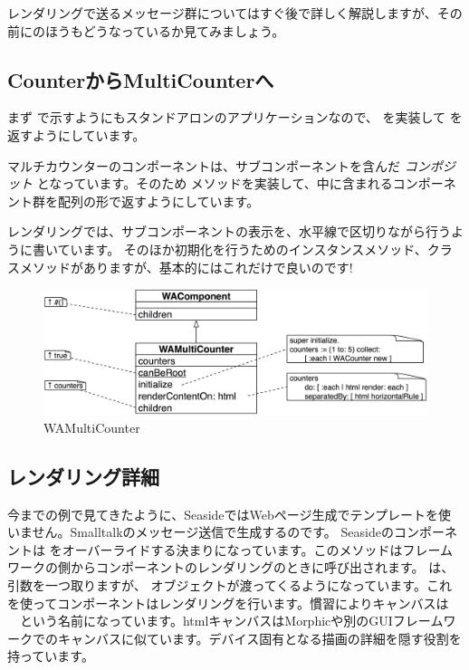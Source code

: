 \documentclass[a4paper,10pt,twoside]{book}
\begin{document}
{{レンダリングで送るメッセージ群についてはすぐ後で詳しく解説しますが、その前にのほうもどうなっているか見てみましょう。

\subsection{CounterからMultiCounterへ}

まず  で示すようにもスタンドアロンのアプリケーションなので、 を実装して を返すようにしています。

マルチカウンターのコンポーネントは、サブコンポーネントを含んだ \emph{コンポジット} となっています。そのため  メソッドを実装して、中に含まれるコンポーネント群を配列の形で返すようにしています。

レンダリングでは、サブコンポーネントの表示を、水平線で区切りながら行うように書いています。
そのほか初期化を行うためのインスタンスメソッド、クラスメソッドがありますが、基本的にはこれだけで良いのです!

\begin{figure}[bht]
\begin{center}
\includegraphics[width=\textwidth]{WAMultiCounter}
\caption{WAMultiCounter}
\end{center}
\end{figure}

\subsection{レンダリング詳細}

今までの例で見てきたように、SeasideではWebページ生成でテンプレートを使いません。Smalltalkのメッセージ送信で生成するのです。
Seasideのコンポーネントは  をオーバーライドする決まりになっています。このメソッドはフレームワークの側からコンポーネントのレンダリングのときに呼び出されます。
 は、引数を一つ取りますが、  オブジェクトが渡ってくるようになっています。これを使ってコンポーネントはレンダリングを行います。慣習によりキャンバスは 　という名前になっています。htmlキャンバスはMorphicや別のGUIフレームワークでのキャンバスに似ています。デバイス固有となる描画の詳細を隠す役割を持っています。

}}
\end{document}
